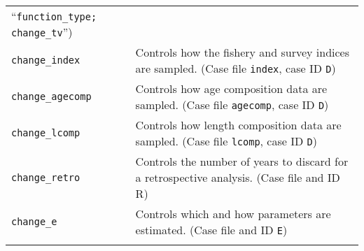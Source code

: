 \begin{longtable}[c]{@{}ll@{}}
\begin{minipage}[t]{0.57\columnwidth}
``\texttt{function\_type; change\_tv}'')
\end{minipage}
\\\noalign{\medskip}
\begin{minipage}[t]{0.32\columnwidth}\raggedright
\texttt{change\_index}
\end{minipage} & \begin{minipage}[t]{0.57\columnwidth}\raggedright
Controls how the fishery and survey indices are sampled. (Case file
\texttt{index}, case ID \texttt{D})
\end{minipage}
\\\noalign{\medskip}
\begin{minipage}[t]{0.32\columnwidth}\raggedright
\texttt{change\_agecomp}
\end{minipage} & \begin{minipage}[t]{0.57\columnwidth}\raggedright
Controls how age composition data are sampled. (Case file \texttt{agecomp},
case ID \texttt{D})
\end{minipage}
\\\noalign{\medskip}
\begin{minipage}[t]{0.32\columnwidth}\raggedright
\texttt{change\_lcomp}
\end{minipage} & \begin{minipage}[t]{0.57\columnwidth}\raggedright
Controls how length composition data are sampled. (Case file \texttt{lcomp},
case ID \texttt{D})
\end{minipage}
\\\noalign{\medskip}
\begin{minipage}[t]{0.32\columnwidth}\raggedright
\texttt{change\_retro}
\end{minipage} & \begin{minipage}[t]{0.57\columnwidth}\raggedright
Controls the number of years to discard for a retrospective analysis. (Case
file and ID \textsf{R})
\end{minipage}
\\\noalign{\medskip}
\begin{minipage}[t]{0.32\columnwidth}\raggedright
\texttt{change\_e}
\end{minipage} & \begin{minipage}[t]{0.57\columnwidth}\raggedright
Controls which and how parameters are estimated. (Case file and ID \texttt{E})
\end{minipage}
\\\noalign{\medskip}
\begin{minipage}[t]{0.32\columnwidth}\raggedright

\end{minipage}
\end{longtable}
